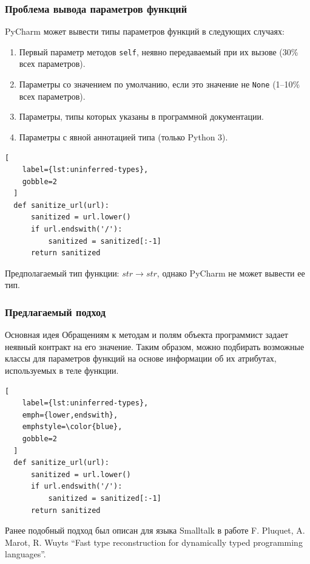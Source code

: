 \documentclass[handout]{beamer}
\begin{document}
\begin{frame}[fragile]
  \frametitle{Проблема вывода параметров функций}

  PyCharm может вывести типы параметров функций в следующих случаях:
  \begin{enumerate}
    \item Первый параметр методов \texttt{self}, неявно передаваемый при их
      вызове (30\% всех параметров).

    \item Параметры со значением по умолчанию, если это значение не
      \texttt{None} (1--10\% всех параметров).

    \item Параметры, типы которых указаны в программной документации.

    \item Параметры с явной аннотацией типа (только Python 3).
  \end{enumerate}

  \begin{lstlisting}[
    label={lst:uninferred-types},
    gobble=2
  ]
  def sanitize_url(url):
      sanitized = url.lower()
      if url.endswith('/'):
          sanitized = sanitized[:-1]
      return sanitized
  \end{lstlisting}

  Предполагаемый тип функции: $str \rightarrow str$, однако PyCharm не может вывести ее
тип.

\end{frame}

\begin{frame}[fragile]
  \frametitle{Предлагаемый подход}
  
  \begin{block}{Основная идея}
    Обращениям к методам и полям объекта программист задает неявный контракт на
    его значение. Таким образом, можно подбирать возможные классы для
    параметров функций на основе информации об их атрибутах, используемых в теле
    функции. 
  \end{block}

  \begin{lstlisting}[
    label={lst:uninferred-types},
    emph={lower,endswith},
    emphstyle=\color{blue},
    gobble=2
  ]
  def sanitize_url(url):
      sanitized = url.lower()
      if url.endswith('/'):
          sanitized = sanitized[:-1]
      return sanitized
  \end{lstlisting}

  Ранее подобный подход был описан для языка Smalltalk в работе F.
  Pluquet, A.  Marot, R. Wuyts ``Fast type reconstruction for dynamically
  typed programming languages''.

\end{frame}
\end{document}
